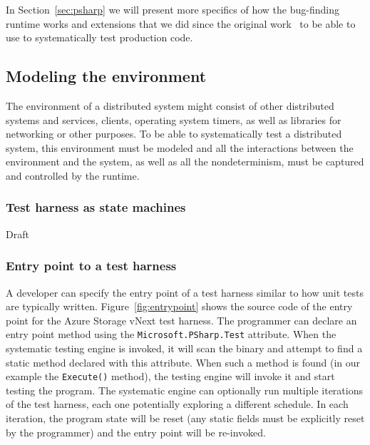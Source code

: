 In Section~\ref{sec:psharp} we will present more specifics of how the \psharp bug-finding runtime works and extensions that we did since the original work~\cite{deligiannis2015psharp} to be able to use \psharp to systematically test production code.

\subsection{Modeling the environment}
\label{sec:method:model}

The environment of a distributed system might consist of other distributed systems and services, clients, operating system timers, as well as libraries for networking or other purposes. To be able to systematically test a distributed system, this environment must be modeled and all the interactions between the environment and the system, as well as all the nondeterminism, must be captured and controlled by the \psharp runtime.

\subsubsection{Test harness as \psharp state machines}
\label{sec:method:model:harness}

Draft

\subsubsection{Entry point to a \psharp test harness}
\label{sec:method:model:entrypoint}

A developer can specify the entry point of a \psharp test harness similar to how unit tests are typically written. Figure~\ref{fig:entrypoint} shows the source code of the entry point for the Azure Storage vNext \psharp test harness. The programmer can declare an entry point method using the \texttt{Microsoft.PSharp.Test} attribute. When the \psharp systematic testing engine is invoked, it will scan the binary and attempt to find a static method declared with this attribute. When such a method is found (in our example the \texttt{Execute()} method), the testing engine will invoke it and start testing the program. The systematic engine can optionally run multiple iterations of the test harness, each one potentially exploring a different schedule. In each iteration, the program state will be reset (any static fields must be explicitly reset by the programmer) and the entry point will be re-invoked.


